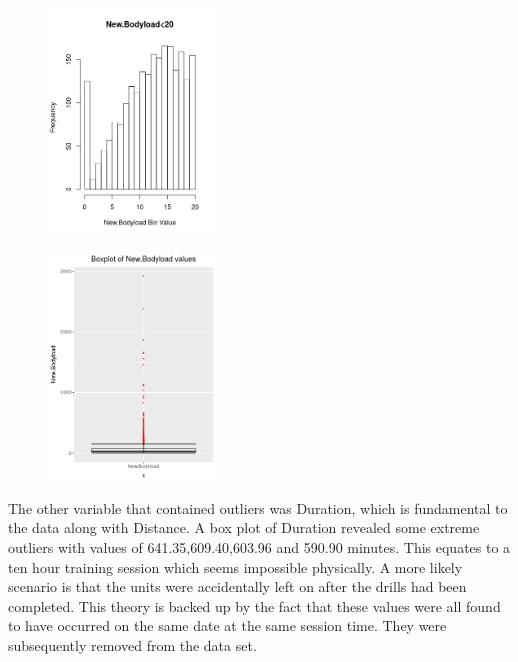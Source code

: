 \begin{figure}[h]
	\centering
	\begin{minipage}{.45\textwidth}
		\centering
		\includegraphics[width=.8\linewidth, height=6cm]{Images/NBLHistSmallVals.png}
		\label{fig:NBLSmall}
	\end{minipage}%
	\begin{minipage}{.5\textwidth}
		\centering
		\includegraphics[width=.8\linewidth, height=6cm]{Images/NBLBoxPlot.png}
		\label{fig:NBLLarge}
	\end{minipage}
\end{figure}
\break\hfill
\newline
The other variable that contained outliers was Duration, which is fundamental to the data along with Distance. A box plot of Duration revealed some extreme outliers with values of 641.35,609.40,603.96 and 590.90 minutes. This equates to a ten hour training session which seems impossible physically. A more likely scenario is that the units were accidentally left on after the drills had been completed. This theory is backed up by the fact that these values were all found to have occurred on the same date at the same session time. They were subsequently removed from the data set.

